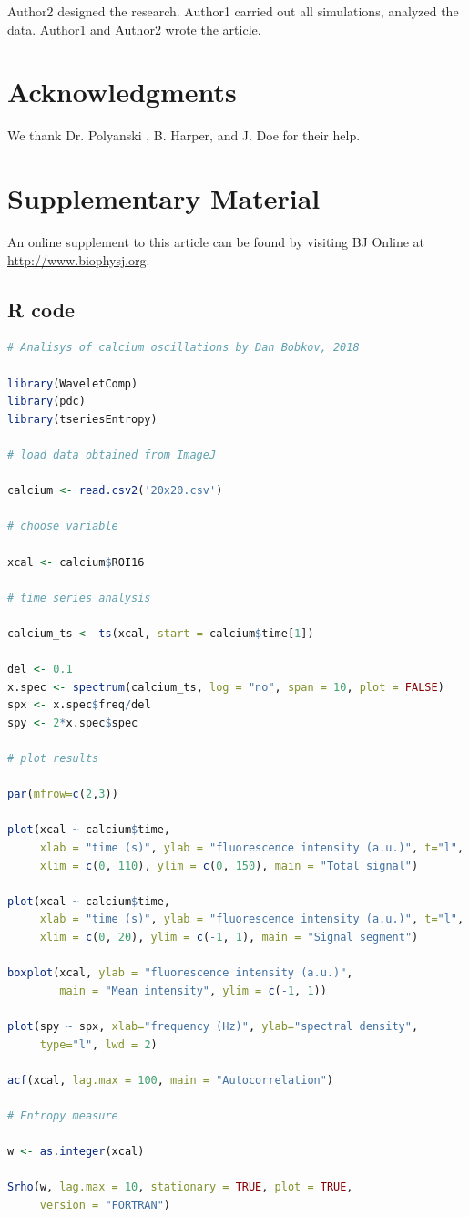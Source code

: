 \documentclass{biophys-new}
\begin{document}
Author2 designed the research. Author1 carried out all simulations, analyzed the data. Author1 and Author2 wrote the article.

\section*{Acknowledgments}

We thank Dr. Polyanski , B. Harper, and J. Doe for their help.




\section*{Supplementary Material}
An online supplement to this article can be found by visiting BJ Online at \url{http://www.biophysj.org}.

\subsection*{R code}

\begin{lstlisting}[language=R]
# Analisys of calcium oscillations by Dan Bobkov, 2018

library(WaveletComp)
library(pdc)
library(tseriesEntropy)

# load data obtained from ImageJ

calcium <- read.csv2('20x20.csv')

# choose variable

xcal <- calcium$ROI16

# time series analysis

calcium_ts <- ts(xcal, start = calcium$time[1])

del <- 0.1
x.spec <- spectrum(calcium_ts, log = "no", span = 10, plot = FALSE)
spx <- x.spec$freq/del
spy <- 2*x.spec$spec

# plot results

par(mfrow=c(2,3))

plot(xcal ~ calcium$time,
     xlab = "time (s)", ylab = "fluorescence intensity (a.u.)", t="l",
     xlim = c(0, 110), ylim = c(0, 150), main = "Total signal")

plot(xcal ~ calcium$time,
     xlab = "time (s)", ylab = "fluorescence intensity (a.u.)", t="l",
     xlim = c(0, 20), ylim = c(-1, 1), main = "Signal segment")

boxplot(xcal, ylab = "fluorescence intensity (a.u.)",
        main = "Mean intensity", ylim = c(-1, 1))

plot(spy ~ spx, xlab="frequency (Hz)", ylab="spectral density",
     type="l", lwd = 2)

acf(xcal, lag.max = 100, main = "Autocorrelation")

# Entropy measure

w <- as.integer(xcal)

Srho(w, lag.max = 10, stationary = TRUE, plot = TRUE,
     version = "FORTRAN")

\end{lstlisting}
\end{document}
